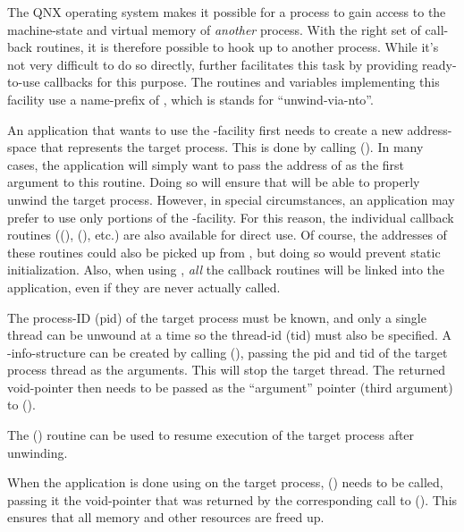 \documentclass{article}
\begin{document}
The QNX operating system makes it possible for a process to
gain access to the machine-state and virtual memory of \emph{another}
process.
With the right set of call-back routines,
it is therefore possible to hook up  to another process.
While it's not very difficult to do so directly,
 further facilitates this task by providing
ready-to-use callbacks for this purpose.
The routines and variables
implementing this facility use a name-prefix of ,
which is stands for ``unwind-via-nto''.

An application that wants to use the -facility first needs
to create a new  address-space that represents the
target process.  This is done by calling
().  In many cases, the application
will simply want to pass the address of  as the
first argument to this routine.  Doing so will ensure that
 will be able to properly unwind the target process.
However, in special circumstances, an application may prefer to use
only portions of the -facility.  For this reason, the
individual callback routines ((),
(), etc.)  are also available for direct
use.  Of course, the addresses of these routines could also be picked
up from , but doing so would prevent static
initialization.  Also, when using , \emph{all}
the callback routines will be linked into the application, even if
they are never actually called.

The process-ID (pid) of the target process must be known,
and only a single thread can be unwound at a time so the thread-id (tid)
must also be specified.
A -info-structure can be created
by calling (), passing the pid and tid of the target
process thread as the arguments.
This will stop the target thread.
The returned void-pointer then needs to be
passed as the ``argument'' pointer (third argument) to
().

The () routine can be used to resume execution of
the target process after unwinding.

When the application is done using  on the target
process, () needs to be called, passing it the
void-pointer that was returned by the corresponding call to
().  This ensures that all memory and other
resources are freed up.
\end{document}

